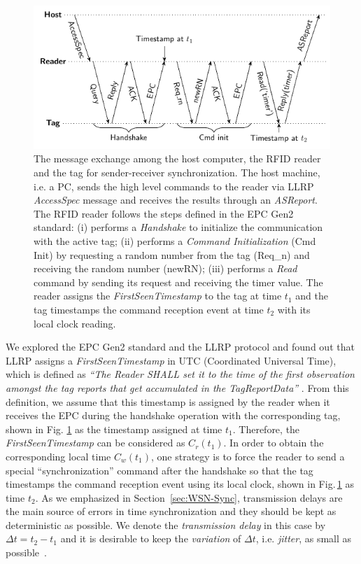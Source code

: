 \documentclass[10pt,journal,compsoc]{IEEEtran}
\begin{document}
\begin{figure}
	\centering
	\includegraphics[width=\columnwidth]{figures/Sender-Receiver.pdf}
	\caption{\label{fig:sender_receiver} The message exchange among the host computer, the RFID reader and the tag for sender-receiver synchronization. The host machine, i.e. a PC,  sends the high level commands to the reader via LLRP \emph{AccessSpec} message and receives the results through an \emph{ASReport}. The RFID reader follows the steps defined in the EPC Gen2 standard: (i) performs a \emph{Handshake} to initialize the communication with the active tag; (ii) performs a \emph{Command Initialization} (Cmd Init) by requesting a random number from the tag (Req\_n) and receiving the random number (newRN); (iii)  performs a \emph{Read} command by sending its request and receiving the timer value. The reader assigns the \emph{FirstSeenTimestamp} to the tag at time $t_1$ and the tag timestamps the command reception event at time $t_2$ with its local clock reading.}
\end{figure}

We explored the EPC Gen2 standard and the LLRP protocol and found out that LLRP assigns a \emph{FirstSeenTimestamp} in UTC (Coordinated Universal Time), which is defined as \emph{``The Reader SHALL set it to the time of the first observation amongst the tag reports that get accumulated in the TagReportData''} \cite[p. 87]{llrp}. From this definition, we assume that this timestamp is assigned by the reader when it receives the EPC during the handshake operation with the corresponding tag, shown in Fig. \ref{fig:sender_receiver} as the timestamp assigned at time $t_1$. Therefore, the \emph{FirstSeenTimestamp} can be considered as $C_r(t_1)$. In order to obtain the corresponding local time $C_w(t_1)$, one strategy is to force the reader to send a special ``synchronization'' command after the handshake so that the tag timestamps the command reception event using its local clock, shown in Fig.\,\ref{fig:sender_receiver} as time $t_2$. As we emphasized in Section~\ref{sec:WSN-Sync}, transmission delays are the main source of errors in time synchronization and they should be kept as deterministic as possible. We denote the \emph{transmission delay} in this case by $\Delta t= t_2-t_1$ and it is desirable to keep the \emph{variation} of $\Delta t$, i.e. \emph{jitter}, as small as possible~\cite{Maroti2004}.
\end{document}
